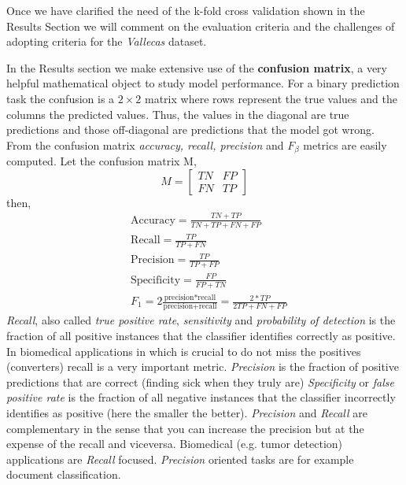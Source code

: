 \documentclass[11pt]{article}
\theoremstyle{definition}
\theoremstyle{remark}
\begin{document}
Once we have clarified the need of the k-fold cross validation shown in the Results Section we will comment on the evaluation criteria and the challenges of adopting criteria for the \emph{Vallecas} dataset.

In the Results section we make extensive use of the \textbf{confusion matrix}, a very helpful mathematical object to study model performance. For a binary prediction task the confusion is a $2 \times 2$ matrix where rows represent the true values and the columns the predicted values. Thus, the values in the diagonal are true predictions and those off-diagonal are predictions that the model got wrong. From the confusion matrix \emph{accuracy, recall, precision} and $F_\beta$ metrics are easily computed.
Let the confusion matrix M,  
\begin{equation*}
M=
  \begin{bmatrix}
    TN & FP  \\
    FN & TP 
  \end{bmatrix}
\end{equation*}
then, 
\begin{equation*}
\begin{split}
&\text{Accuracy} = \frac{TN + TP}{TN+TP+FN+FP} \\
&\text{Recall} = \frac{TP}{TP+FN} \\
&\text{Precision} = \frac{TP}{TP+FP} \\
&\text{Specificity} = \frac{FP}{FP+TN} \\
&F_1 = 2\frac{\text{precision*recall}}{\text{precision}+\text{recall}} = \frac{2 * TP}{2TP + FN + FP}
\end{split}
\end{equation*}
\emph{Recall}, also called \emph{true positive rate}, \emph{sensitivity} and \emph{probability of detection} is the fraction of all positive instances that the classifier identifies correctly as positive. In biomedical applications in which is crucial to do not miss the positives (converters) recall is a very important metric.
\emph{Precision} is the fraction of positive predictions that are correct (finding sick when they truly are)
\emph{Specificity} or \emph{false positive rate} is the fraction of all negative instances that the classifier incorrectly identifies as positive (here the smaller the better).
\emph{Precision} and \emph{Recall} are complementary in the sense that you can increase the precision but at the expense of the recall and viceversa. Biomedical (e.g. tumor detection) applications are \emph{Recall} focused. \emph{Precision} oriented tasks are for example document classification. 
\end{document}
